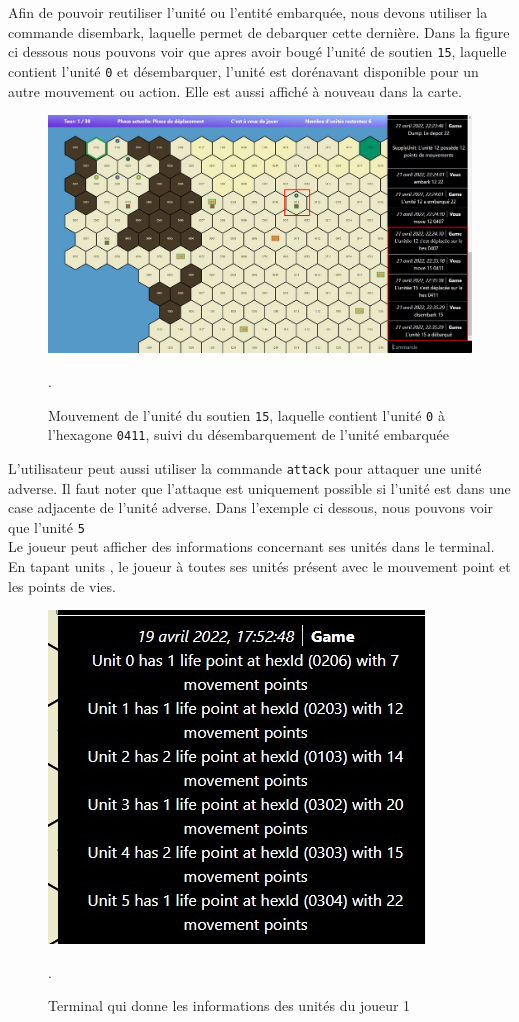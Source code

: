 Afin de pouvoir reutiliser l'unité ou l'entité embarquée, nous devons utiliser la commande disembark, laquelle permet de debarquer cette dernière.
Dans la figure ci dessous nous pouvons voir que apres avoir bougé l'unité de soutien {\tt 15}, laquelle contient l'unité {\tt 0} et désembarquer, l'unité est dorénavant disponible pour un autre mouvement ou action. Elle est aussi affiché à nouveau dans la carte.\\

\begin{figure}[H]
    \centering
    \includegraphics[scale=0.35]{data/Disembark.jpg}
    \caption{Mouvement de l'unité du soutien \lstinline{15}, laquelle contient l'unité \lstinline{0} à l'hexagone \lstinline{0411}, suivi du désembarquement de l'unité embarquée}.
\end{figure}

L'utilisateur peut aussi utiliser la commande {\tt attack} pour attaquer une unité adverse. Il faut noter que l'attaque est uniquement possible si l'unité est dans une case adjacente de l'unité adverse. Dans l'exemple ci dessous, nous pouvons voir que l'unité {\tt 5} \\

Le joueur peut afficher des informations concernant ses unités dans le terminal.
En tapant \og units \fg{}, le joueur à toutes ses unités présent avec le mouvement point et  les points de vies.\\
\begin{figure}[H]
    \centering
    \includegraphics[scale=0.6]{data/info_units.jpg}
    \caption{Terminal qui donne les informations des unités du joueur 1 }.
\end{figure}

